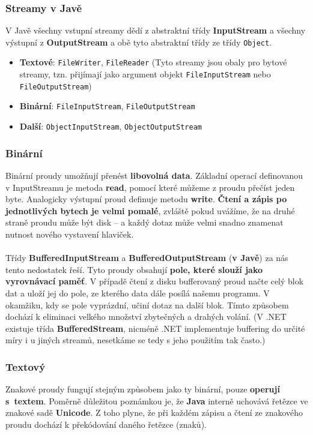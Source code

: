 \subsubsection{Streamy v Javě}
V Javě všechny vstupní streamy dědí z abstraktní třídy \textbf{InputStream} a všechny výstupní z \textbf{OutputStream} a obě tyto abstraktní třídy ze třídy \texttt{Object}.
\begin{itemize}
	\item \textbf{Textové}: \texttt{FileWriter}, \texttt{FileReader} (Tyto streamy jsou obaly pro bytové streamy, tzn. přijímají jako argument objekt \texttt{FileInputStream} nebo \texttt{FileOutputStream})
	\item \textbf{Binární}:	 \texttt{FileInputStream},	 \texttt{FileOutputStream} 
	\item \textbf{Další}: \texttt{ObjectInputStream}, \texttt{ObjectOutputStream}
\end{itemize}

\subsubsection{Binární}
Binární proudy umožňují přenést \textbf{libovolná data}. Základní operací definovanou v InputStreamu je metoda \textbf{read}, pomocí které můžeme z proudu přečíst jeden byte. Analogicky výstupní proud definuje metodu \textbf{write}. \textbf{Čtení a zápis po jednotlivých bytech je velmi pomalé}, zvláště pokud uvážíme, že na druhé straně proudu může být disk – a každý dotaz může velmi snadno znamenat nutnost nového vystavení hlaviček.
\\\\
Třídy \textbf{BufferedInputStream} a \textbf{BufferedOutputStream} (\textbf{v Javě}) za nás tento nedostatek řeší. Tyto proudy obsahují \textbf{pole, které slouží jako vyrovnávací paměť}. V případě čtení z disku bufferovaný proud načte celý blok dat a uloží jej do pole, ze kterého data dále posílá našemu programu. V okamžiku, kdy se pole vyprázdní, učiní dotaz na další blok. Tímto způsobem dochází k eliminaci velkého množství zbytečných a drahých volání. (V .NET existuje třída \textbf{BufferedStream}, nicméně .NET implementuje buffering do určité míry i u jiných streamů, nesetkáme se tedy s jeho použitím tak často.)

\subsubsection{Textový}
Znakové proudy fungují stejným způsobem jako ty binární, pouze \textbf{operují s textem}. Poměrně důležitou poznámkou je, že \textbf{Java} interně uchovává řetězce ve znakové sadě \textbf{Unicode}. Z toho plyne, že při každém zápisu a čtení ze znakového proudu dochází k překódování daného řetězce (znaků).

